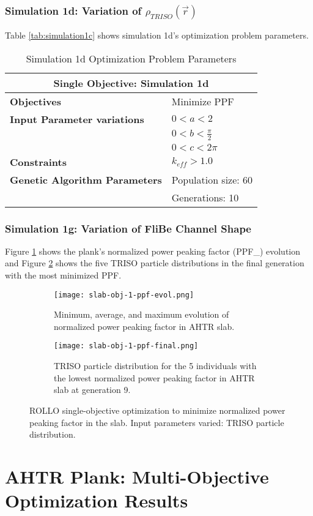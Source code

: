 \subsubsection{Simulation 1d: Variation of $\rho_{TRISO}(\vec{r})$}
Table \ref{tab:simulation1c} shows simulation 1d's optimization problem parameters. 
\begin{table}[H]
    \centering
    \onehalfspacing
    \caption{Simulation 1d Optimization Problem Parameters}
	\label{tab:simulation1d}
    \footnotesize
    \begin{tabular}{l|p{3cm}}
    \hline 
    \multicolumn{2}{c}{\textbf{Single Objective: Simulation 1d}} \\
    \hline 
    \textbf{Objectives} & Minimize PPF \\
    \hline 
    \textbf{Input Parameter variations} & $0<a<2$ \\
    & $0<b<\frac{\pi}{2}$ \\
    & $0<c<2\pi$ \\
    \hline
    \textbf{Constraints} & $k_{eff} > 1.0$\\ 
    \hline 
    \textbf{Genetic Algorithm Parameters} & Population size: 60 \\
    & Generations: 10 \\
    \hline
    \end{tabular}
\end{table}

\subsubsection{Simulation 1g: Variation of FliBe Channel Shape}
Figure \ref{fig:slab-obj-1-ppf-evol} shows the plank's normalized power peaking 
factor (PPF_) evolution and Figure \ref{fig:slab-obj-1-ppf-final} shows the five 
TRISO particle distributions in the final generation with the most minimized PPF.
\begin{figure}[]
    \centering
    \begin{subfigure}{\textwidth}
        \texttt{[image: slab-obj-1-ppf-evol.png]}
        \caption{Minimum, average, and maximum evolution of normalized power 
        peaking factor in AHTR slab.}
        \label{fig:slab-obj-1-ppf-evol} 
    \end{subfigure}
    \begin{subfigure}{\textwidth}
        \texttt{[image: slab-obj-1-ppf-final.png]}
        \caption{TRISO particle distribution for the 5 individuals with the 
        lowest normalized power peaking factor in AHTR slab at generation 9.}
        \label{fig:slab-obj-1-ppf-final} 
    \end{subfigure}
    \caption{ROLLO single-objective optimization to minimize normalized power 
    peaking factor in the slab. Input parameters varied: TRISO particle distribution.}
    \label{fig:slab-obj-1-ppf}
\end{figure}

\section{AHTR Plank: Multi-Objective Optimization Results}